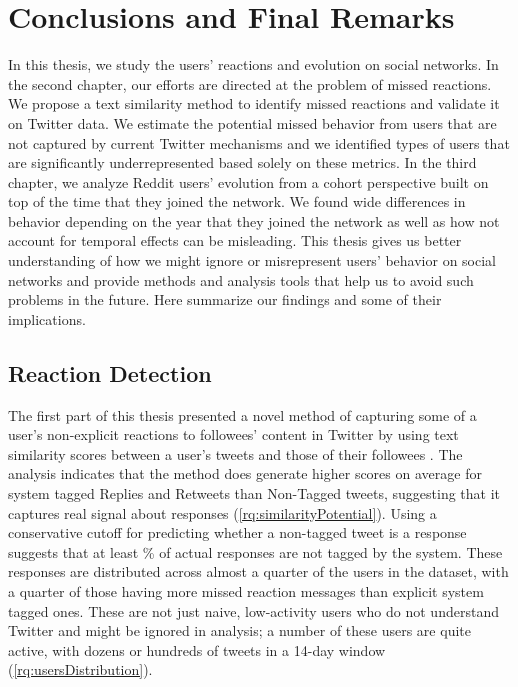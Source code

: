 \chapter{Conclusions and Final Remarks}
\label{ch:conclusions}

In this thesis, we study the users' reactions and evolution on social networks. In the second chapter, our efforts are directed at the problem of missed reactions. We propose a text similarity method to identify missed reactions and validate it on Twitter data. We estimate the potential missed behavior from users that are not captured by current Twitter mechanisms and we identified types of users that are significantly underrepresented based solely on these metrics. In the third chapter, we analyze Reddit users' evolution from a cohort perspective built on top of the time that they joined the network. We found wide differences in behavior depending on the year that they joined the network as well as how not account for temporal effects can be misleading. This thesis gives us better understanding of how we might ignore or misrepresent users' behavior on social networks and provide methods and analysis tools that help us to avoid such problems in the future. Here summarize our findings and some of their implications.

\section{Reaction Detection}

The first part of this thesis presented a novel method of capturing some of a user's non-explicit reactions to followees' content in Twitter by using text similarity scores between a user's tweets and those of their followees \cite{Barbosa}.  The analysis indicates that the method does generate higher scores on average for system tagged Replies and Retweets than Non-Tagged tweets, suggesting that it captures real signal about responses (\ref{rq:similarityPotential}).  Using a conservative cutoff for predicting whether a non-tagged tweet is a response suggests that at least \highNonTaggedTweetCountPct{}\% of actual responses are not tagged by the system.  These responses are distributed across almost a quarter of the users in the dataset, with a quarter of those having more missed reaction messages than explicit system tagged ones. These are not just naive, low-activity users who do not understand Twitter and might be ignored in analysis; a number of these users are quite active, with dozens or hundreds of tweets in a 14-day window (\ref{rq:usersDistribution}).  

